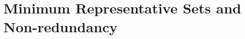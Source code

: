 \documentclass[11pt]{article}
\newcommand{\Comments}{1}
\newcommand{\mytodo}[2]{\ifnum\Comments=1%
  \todo[linecolor=#1!80!black,backgroundcolor=#1,bordercolor=#1!80!black]{#2}\fi}
\newcommand{\jessiet}[1]{\mytodo{teal!20!white}{JF: #1}}
\newcommand{\prop}[1]{\mathrm{prop}[#1]}
\newcommand{\simplex}{\Delta_\Y}
\newcommand{\Y}{\mathcal{Y}}
\newcommand{\inprod}[2]{\langle #1, #2 \rangle}%
\newcommand{\elltopk}{\ell^{\text{top-$k$}}}
\begin{document}
%
%
%
%




\section{Minimum Representative Sets and Non-redundancy}
\label{sec:min-rep-sets}
\end{document}
